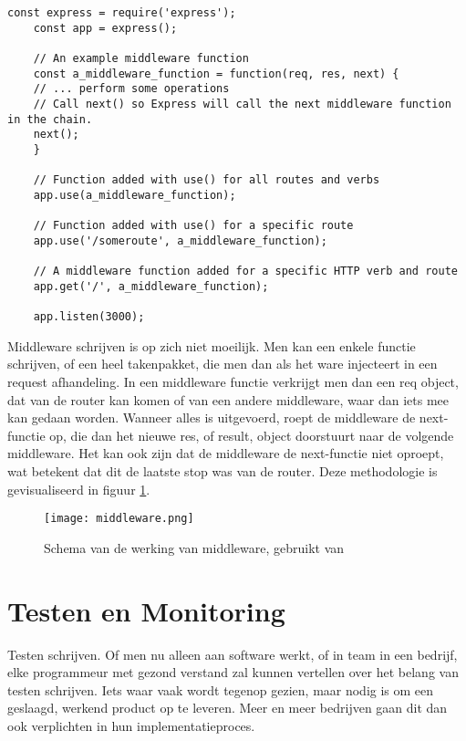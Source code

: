 \begin{minipage}{\linewidth}
	\begin{lstlisting}[style=ES6,
						caption={Express code flow voorbeeld.},
						label=code:expressexample]
	const express = require('express');
	const app = express();
	
	// An example middleware function
	const a_middleware_function = function(req, res, next) {
	// ... perform some operations
	// Call next() so Express will call the next middleware function in the chain.
	next();
	}
	
	// Function added with use() for all routes and verbs
	app.use(a_middleware_function);
	
	// Function added with use() for a specific route
	app.use('/someroute', a_middleware_function);
	
	// A middleware function added for a specific HTTP verb and route
	app.get('/', a_middleware_function);
	
	app.listen(3000);
	\end{lstlisting}
\end{minipage}	
	
Middleware schrijven is op zich niet moeilijk. Men kan een enkele functie schrijven, of een heel takenpakket, die men dan als het ware injecteert in een request afhandeling. In een middleware functie verkrijgt men dan een req object, dat van de router kan komen of van een andere middleware, waar dan iets mee kan gedaan worden. Wanneer alles is uitgevoerd, roept de middleware de next-functie op, die dan het nieuwe res, of result, object doorstuurt naar de volgende middleware. Het kan ook zijn dat de middleware de next-functie niet oproept, wat betekent dat dit de laatste stop was van de router. Deze methodologie is gevisualiseerd in figuur \ref{fig:middleware}.

\begin{figure}[h]
	\texttt{[image: middleware.png]}
	\caption{Schema van de werking van middleware, gebruikt van \cite{middleware}}
	\label{fig:middleware}
\end{figure}

\pagebreak
\section{Testen en Monitoring}
\label{sec:testAndMonitoring}

Testen schrijven. Of men nu alleen aan software werkt, of in team in een bedrijf, elke programmeur met gezond verstand zal kunnen vertellen over het belang van testen schrijven. Iets waar vaak wordt tegenop gezien, maar nodig is om een geslaagd, werkend product op te leveren. Meer en meer bedrijven gaan dit dan ook verplichten in hun implementatieproces. 

